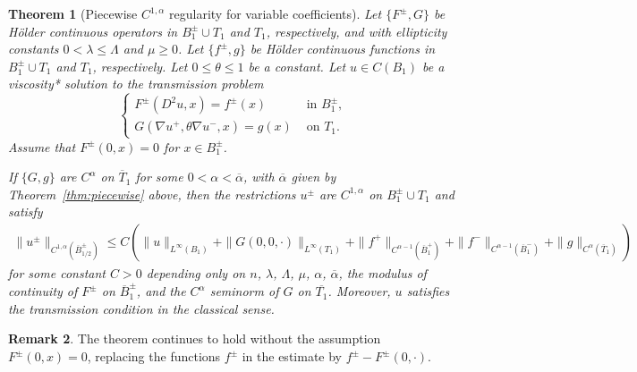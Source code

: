 \documentclass[letter,11pt]{amsart}
\newtheorem{thm}{Theorem}[section]
\theoremstyle{definition}
\newtheorem{rem}[thm]{Remark}
\numberwithin{equation}{section}
\begin{document}
\begin{thm}
[Piecewise $C^{1,\alpha}$ regularity for variable coefficients]
\label{thm:main}
Let $\{F^{\pm}, G\}$ be H\"{o}lder continuous operators in $B_1^{\pm} \cup T_1$ and $T_1$, respectively, and with ellipticity constants $0 < \lambda \leq \Lambda$ and $\mu \geq 0$.
Let $\{f^{\pm}, g\}$ be H\"{o}lder continuous functions in $B_1^{\pm} \cup T_1$ and $T_1$, respectively.
Let $0 \leq \theta \leq 1$ be a constant.
Let $u \in C(B_1)$ be a viscosity* solution to the transmission problem
\[
\begin{cases}
F^{\pm}(D^2u, x) = f^{\pm}(x) & \text{ in } B_1^{\pm},\\
G(\nabla u^{+}, \theta \nabla u^{-}, x) =g(x) & \text{ on } T_1.
\end{cases}
\]
Assume that $F^{\pm}(0,x) = 0$ for $x \in B_1^{\pm}$.

If $\{G, g\}$ are $C^{\alpha}$ on $\overline{T}_1$ for some $0 <\alpha < \overline{\alpha}$, with  $\overline{\alpha}$ given by Theorem~\ref{thm:piecewise} above, then the restrictions $u^{\pm}$ are $C^{1,\alpha}$ on $B_{1}^{\pm} \cup T_1$ and satisfy
\[
\begin{split}
\|u^{\pm}\|_{C^{1,\alpha}(\overline{B}^{\pm}_{1/2})}
\leq C \left(\|u\|_{L^{\infty}(B_1)} 
+ \|G(0,0,\cdot)\|_{L^{\infty}(T_1)}
+ \|f^{+}\|_{C^{\alpha-1}(\overline{B}_1^{+})}
+ \|f^{-}\|_{C^{\alpha-1}(\overline{B}_1^{-})}
+ \|g\|_{C^{\alpha}(\overline{T}_1)}
 \right)
 \end{split}
\]
for some constant $C > 0$ depending only on $n$, $\lambda$, $\Lambda$, $\mu$, $\alpha$, $\overline{\alpha}$, the modulus of continuity of $F^{\pm}$ on $\overline{B}_{1}^{\pm}$, and the $C^{\alpha}$ seminorm of $G$ on $\overline{T_1}$.
Moreover, $u$ satisfies the transmission condition in the classical sense.
\end{thm}

\begin{rem}
The theorem continues to hold without the assumption $F^{\pm}(0,x) = 0$, replacing the functions $f^{\pm}$ in the estimate by $f^{\pm} - F^{\pm}(0, \cdot)$.
\end{rem}
\end{document}
